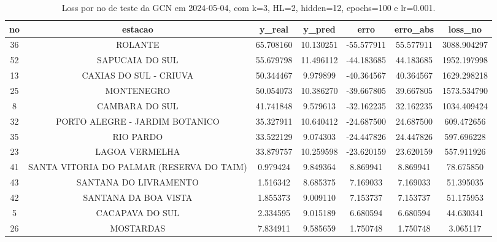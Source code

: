 \begin{table}[h]
\centering
\caption{Loss por no de teste da GCN em 2024-05-04, com k=3, HL=2, hidden=12, epochs=100 e lr=0.001.}
\label{tab:gcn_loss_k3_hl2_h12_e100_d20240504}
\begin{tabular}{ccccccc}
\toprule
no & estacao & y\_real & y\_pred & erro & erro\_abs & loss\_no \\
\midrule
36 & ROLANTE & 65.708160 & 10.130251 & -55.577911 & 55.577911 & 3088.904297 \\
52 & SAPUCAIA DO SUL & 55.679798 & 11.496112 & -44.183685 & 44.183685 & 1952.197998 \\
13 & CAXIAS DO SUL - CRIUVA & 50.344467 & 9.979899 & -40.364567 & 40.364567 & 1629.298218 \\
25 & MONTENEGRO & 50.054073 & 10.386270 & -39.667805 & 39.667805 & 1573.534790 \\
8 & CAMBARA DO SUL & 41.741848 & 9.579613 & -32.162235 & 32.162235 & 1034.409424 \\
32 & PORTO ALEGRE - JARDIM BOTANICO & 35.327911 & 10.640412 & -24.687500 & 24.687500 & 609.472656 \\
35 & RIO PARDO & 33.522129 & 9.074303 & -24.447826 & 24.447826 & 597.696228 \\
23 & LAGOA VERMELHA & 33.879757 & 10.259598 & -23.620159 & 23.620159 & 557.911926 \\
41 & SANTA VITORIA DO PALMAR (RESERVA DO TAIM) & 0.979424 & 9.849364 & 8.869941 & 8.869941 & 78.675850 \\
43 & SANTANA DO LIVRAMENTO & 1.516342 & 8.685375 & 7.169033 & 7.169033 & 51.395035 \\
42 & SANTANA DA BOA VISTA & 1.855373 & 9.009110 & 7.153737 & 7.153737 & 51.175953 \\
5 & CACAPAVA DO SUL & 2.334595 & 9.015189 & 6.680594 & 6.680594 & 44.630341 \\
26 & MOSTARDAS & 7.834911 & 9.585659 & 1.750748 & 1.750748 & 3.065117 \\
\bottomrule
\end{tabular}
\end{table}
